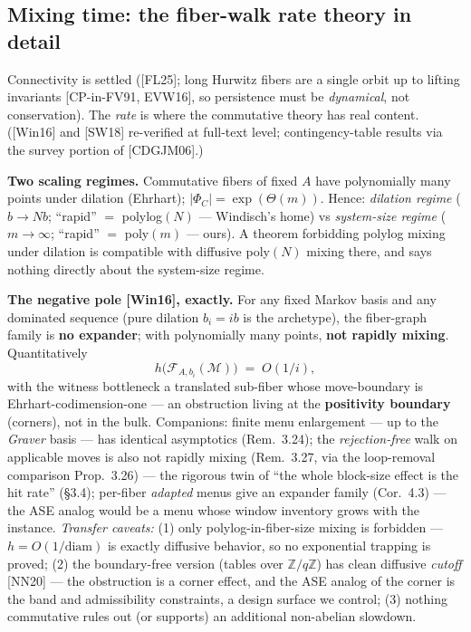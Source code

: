 \documentclass[11pt]{article}
\begin{document}
\subsection{Mixing time: the fiber-walk rate theory in detail}\label{ss:mix}
Connectivity is settled ([FL25]; long Hurwitz fibers are a single orbit up to lifting invariants
[CP-in-FV91, EVW16], so persistence must be \emph{dynamical}, not conservation). The \emph{rate} is
where the commutative theory has real content. ([Win16] and [SW18] re-verified at full-text level;
contingency-table results via the survey portion of [CDGJM06].)

\textbf{Two scaling regimes.} Commutative fibers of fixed $A$ have polynomially many points under
dilation (Ehrhart); $|\Phi_C|=\exp(\Theta(m))$. Hence: \emph{dilation regime} ($b\to Nb$; ``rapid''
$=$ polylog$(N)$ --- Windisch's home) vs \emph{system-size regime} ($m\to\infty$; ``rapid'' $=$
poly$(m)$ --- ours). A theorem forbidding polylog mixing under dilation is compatible with diffusive
poly$(N)$ mixing there, and says nothing directly about the system-size regime.

\textbf{The negative pole [Win16], exactly.} For any fixed Markov basis and any dominated sequence
(pure dilation $b_i=ib$ is the archetype), the fiber-graph family is \textbf{no expander}; with
polynomially many points, \textbf{not rapidly mixing}. Quantitatively
\[
  h\big(\mathcal{F}_{A,b_i}(\mathcal{M})\big) \;=\; O(1/i),
\]
with the witness bottleneck a translated sub-fiber whose move-boundary is Ehrhart-codimension-one ---
an obstruction living at the \textbf{positivity boundary} (corners), not in the bulk. Companions:
finite menu enlargement --- up to the \emph{Graver} basis --- has identical asymptotics
(Rem.~3.24); the \emph{rejection-free} walk on applicable moves is also not rapidly mixing
(Rem.~3.27, via the loop-removal comparison Prop.~3.26) --- the rigorous twin of ``the whole
block-size effect is the hit rate'' (\S3.4);
per-fiber \emph{adapted} menus give an expander family (Cor.~4.3) --- the ASE analog would be a menu
whose window inventory grows with the instance. \emph{Transfer caveats:} (1) only
polylog-in-fiber-size mixing is forbidden --- $h = O(1/\mathrm{diam})$ is exactly diffusive behavior,
so no exponential trapping is proved; (2) the boundary-free version (tables over
$\mathbb{Z}/q\mathbb{Z}$) has clean diffusive \emph{cutoff} [NN20] --- the obstruction is a corner
effect, and the ASE analog of the corner is the band and admissibility constraints, a design surface
we control; (3) nothing commutative rules out (or supports) an additional non-abelian slowdown.
\end{document}
